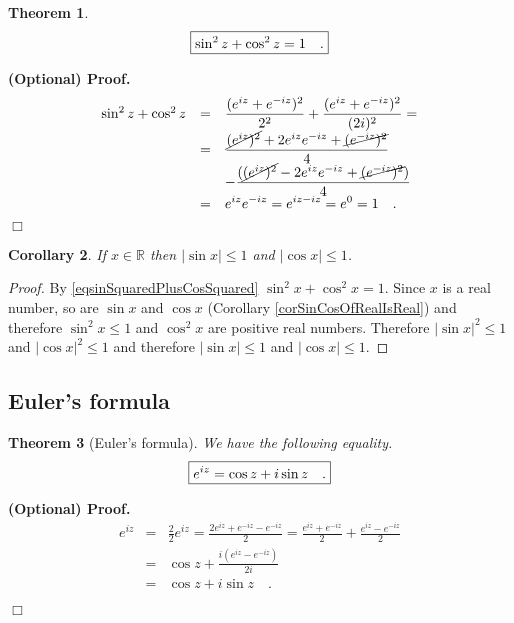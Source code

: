 \documentclass[12pt]{book}
\newenvironment{proofOptional}[1][]{ \noindent \textbf{(Optional) Proof#1.}}{$\Box$\medskip}
\newtheorem{theorem}{Theorem}[section]
\newtheorem{corollary}[theorem]{Corollary}
\begin{document}
\begin{theorem}
\begin{equation}\boxed{\label{eqsinSquaredPlusCosSquared}
\sin^2 z +\cos^2 z= 1\quad .
}
\end{equation}

\end{theorem}
\begin{proofOptional}
\begin{equation*}
\begin{array}{rcl}
\sin^2 z +\cos^2 z&=&\displaystyle  \frac{(e^{iz} + e^{-iz})^2 }{2^2} + \frac{(e^{iz}+e^{-iz})^2}{(2i)^2}=\\
&=&\displaystyle \frac{ \cancel{(e^{iz})^2} + 2 e^{iz}e^{-iz} + \cancel{(e^{-iz})^2}}{4} \\
&&\displaystyle -\frac{(\cancel{(e^{iz})^2}-2e^{iz}e^{-iz} + \cancel{(e^{-iz})^2})}{4} \\
&=& \displaystyle e^{iz}e^{-iz}= e^{iz-iz}=e^0=1\quad .
\end{array}
\end{equation*}
\end{proofOptional}
\begin{corollary}
If $x\in \mathbb R$ then $|\sin x|\leq 1$ and $|\cos x| \leq 1$.
\end{corollary}
\begin{proof}
By  \eqref{eqsinSquaredPlusCosSquared} $\sin^2 x+\cos ^2 x=1$. Since $x$ is a real number, so are $\sin x$ and $\cos x$ (Corollary \ref{corSinCosOfRealIsReal}) and therefore $\sin^2x\leq 1$ and $\cos^2 x$ are positive real numbers. Therefore  $|\sin x|^2\leq 1$ and $|\cos x|^2\leq 1$ and therefore $|\sin x|\leq 1$ and $|\cos x|\leq 1$.
\end{proof}
\subsection{Euler's formula}
\begin{theorem}[Euler's formula]
We have the following equality.
\begin{equation}\boxed{\label{eqEulerExp}
e^{iz}= \cos z+ i\sin z \quad .
}
\end{equation}
\end{theorem}
\begin{proofOptional}
\[
\begin{array}{rcl}
\displaystyle e^{iz}&=&\displaystyle  \frac{2}{2}e^{iz}= \frac{2e^{iz} + e^{-iz} - e^{-iz}}{2} = \frac{e^{iz}+e^{-iz}}2 +\frac{e^{iz}-e^{-iz}}2\\
&=&\displaystyle  \cos z + \frac{i(e^{iz}-e^{-iz})}{2i}\\
&=& \displaystyle \cos z+i \sin z\quad .
\end{array}
\]

\end{proofOptional}
\end{document}
